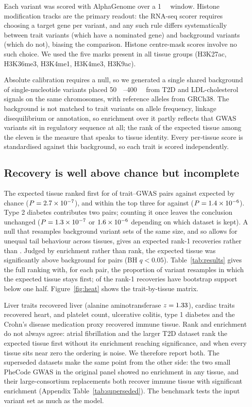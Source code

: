 \documentclass[11pt]{article}
\begin{document}
Each variant was scored with AlphaGenome over a \SI{1}{\mega\bp} window. Histone
modification tracks are the primary readout: the RNA-seq scorer requires choosing a
target gene per variant, and any such rule differs systematically between trait
variants (which have a nominated gene) and background variants (which do not), biasing
the comparison. Histone centre-mask scores involve no such choice. We used the five
marks present in all tissue groups (H3K27ac, H3K36me3, H3K4me1, H3K4me3, H3K9ac).

Absolute calibration requires a null, so we generated a single shared background of
\NBG{} single-nucleotide variants placed \SIrange{50}{400}{\kilo\bp} from T2D and
LDL-cholesterol signals on the same chromosomes, with reference alleles from GRCh38. The
background is not matched to trait variants on allele frequency, linkage disequilibrium
or annotation, so enrichment over it partly reflects that GWAS variants sit in regulatory
sequence at all; the rank of the expected tissue among the eleven is the measure that
speaks to tissue identity. Every per-tissue score is standardised against this
background, so each trait is scored independently.

\subsection{Recovery is well above chance but incomplete}

The expected tissue ranked first for \NHITONE{} of \NTRAITS{} trait--GWAS pairs against
\CHANCEONE{} expected by chance ($P = 2.7\times 10^{-7}$), and within the top three for
\NHITTHREE{} against \CHANCETHREE{} ($P = 1.4\times 10^{-6}$). Type 2 diabetes contributes two
pairs; counting it once leaves the conclusion unchanged ($P = 1.3\times 10^{-7}$ or
$1.6\times 10^{-6}$ depending on which dataset is kept). A null that resamples background
variant sets of the same size, and so allows for unequal tail behaviour across tissues,
gives an expected \CHANCECAL{} rank-1 recoveries rather than \CHANCEONE{}. Judged by
enrichment rather than rank, the expected tissue was significantly above background for
\NSIG{} pairs (BH $q < 0.05$). Table~\ref{tab:results} gives the full ranking with, for
each pair, the proportion of variant resamples in which the expected tissue stays first;
\NFRAGILE{} of the \NHITONE{} rank-1 recoveries have bootstrap support below one half.
Figure~\ref{fig:heat} shows the trait-by-tissue matrix.

Liver traits recovered liver (alanine aminotransferase $z = 1.33$), cardiac traits
recovered heart, and platelet count, ulcerative colitis, type 1 diabetes and the Crohn's
disease medication proxy recovered immune tissue.
Rank and
enrichment do not always agree: atrial fibrillation and the larger T2D dataset rank the
expected tissue first without its enrichment reaching significance, and when every tissue
sits near zero the ordering is noise. We therefore report both. The superseded datasets
make the same point from the other side: the two small PheCode GWAS in the original panel
showed no enrichment in any tissue, and their large-consortium replacements both recover
immune tissue with significant enrichment (Appendix Table~\ref{tab:superseded}). The
benchmark tests the input variant set as much as the model.
\end{document}
